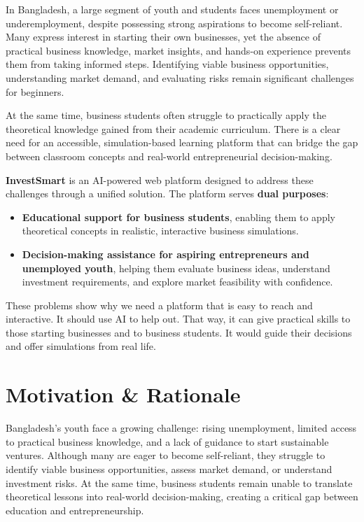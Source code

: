 \documentclass[12pt,letterpaper]{article}
\begin{document}
In Bangladesh, a large segment of youth and students faces unemployment or underemployment, despite possessing strong aspirations to become self-reliant. Many express interest in starting their own businesses, yet the absence of practical business knowledge, market insights, and hands-on experience prevents them from taking informed steps. Identifying viable business opportunities, understanding market demand, and evaluating risks remain significant challenges for beginners.

At the same time, business students often struggle to practically apply the theoretical knowledge gained from their academic curriculum. There is a clear need for an accessible, simulation-based learning platform that can bridge the gap between classroom concepts and real-world entrepreneurial decision-making.

\textbf{InvestSmart} is an AI-powered web platform designed to address these challenges through a unified solution. The platform serves \textbf{dual purposes}:

\begin{itemize}
    \item \textbf{Educational support for business students}, enabling them to apply theoretical concepts in realistic, interactive business simulations.
    \item \textbf{Decision-making assistance for aspiring entrepreneurs and unemployed youth}, helping them evaluate business ideas, understand investment requirements, and explore market feasibility with confidence.
\end{itemize}

These problems show why we need a platform that is easy to reach and interactive. It should use AI to help out. That way, it can give practical skills to those starting businesses and to business students. It would guide their decisions and offer simulations from real life.

\section{Motivation \& Rationale}

Bangladesh's youth face a growing challenge: rising unemployment, limited access to practical business knowledge, and a lack of guidance to start sustainable ventures. Although many are eager to become self-reliant, they struggle to identify viable business opportunities, assess market demand, or understand investment risks. At the same time, business students remain unable to translate theoretical lessons into real-world decision-making, creating a critical gap between education and entrepreneurship.
\end{document}
